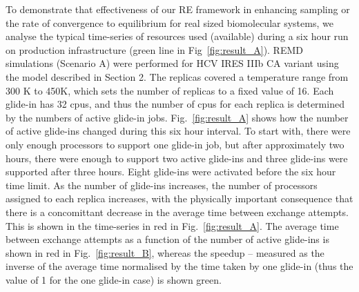 \documentclass{rspublic}
\begin{document}
To demonstrate that effectiveness of our RE framework in enhancing
sampling or the rate of convergence to equilibrium for real sized
biomolecular systems, we analyse the typical time-series of resources
used (available) during a six hour run on production infrastructure
(green line in Fig~\ref{fig:result_A}).  REMD simulations (Scenario A)
were performed for HCV IRES IIIb CA variant using the model described
in Section 2. The replicas covered a temperature range from 300 K to
450K, which sets the number of replicas to a fixed value of 16.  Each
glide-in has 32 cpus, and thus the number of cpus for each replica is
determined by the numbers of active glide-in jobs.
Fig.~\ref{fig:result_A} shows how the number of active glide-ins
changed during this six hour interval. To start with, there were only
enough processors to support one glide-in job, but after approximately
two hours, there were enough to support two active glide-ins and three
glide-ins were supported after three hours. Eight glide-ins were
activated before the six hour time limit. As the number of glide-ins
increases, the number of processors assigned to each replica
increases, with the physically important consequence that there is a
concomittant decrease in the average time between exchange
attempts. This is shown in the time-series in red in
Fig.~\ref{fig:result_A}.  The average time between exchange attempts
as a function of the number of active glide-ins is shown in red in
Fig.~\ref{fig:result_B}, whereas the speedup -- measured as the inverse
of the average time normalised by the time taken by one glide-in (thus
the value of 1 for the one glide-in case) is shown green.
\end{document}
